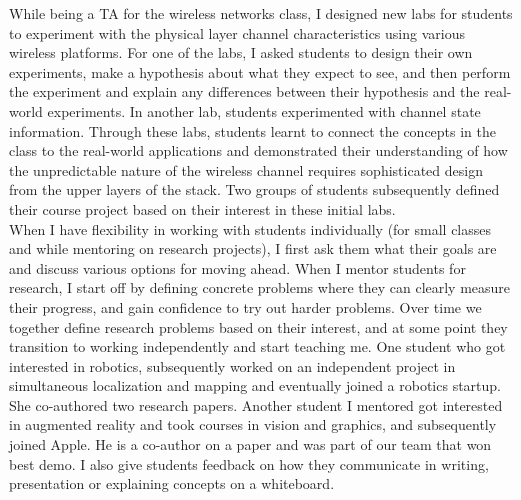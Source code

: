 \documentclass[10pt]{article}
\begin{document}
While being a TA for the wireless networks class, I designed new labs for students to experiment with the physical layer channel characteristics using various wireless platforms. 
For one of the labs, I asked students to design their own experiments, make a hypothesis about what they expect to see, and then perform the experiment and explain any differences between their hypothesis and the real-world experiments. In another lab, students experimented with channel state information. Through these labs, students learnt to connect the concepts in the class to the real-world applications and demonstrated their understanding of how the unpredictable nature of the wireless channel requires sophisticated design from the upper layers of the stack. Two groups of students subsequently defined their course project based on their interest in these initial labs. \\ 

When I have flexibility in working with students individually (for small classes and while mentoring on research projects), I first ask them what their goals are and discuss various options for moving ahead. 
When I mentor students for research, I start off by defining concrete problems where they can clearly measure their progress, and gain confidence to try out harder problems. Over time we together define research problems based on their interest, and at some point they transition to working independently and start teaching me. One student who got interested in robotics, subsequently worked on an independent project in simultaneous localization and mapping and eventually joined a robotics startup. She co-authored two research papers. Another student I mentored got interested in augmented reality and took courses in vision and graphics, and subsequently joined Apple. He is a co-author on a paper and was part of our team that won best demo. I also give students feedback on how they communicate in writing, presentation or explaining concepts on a whiteboard.
\end{document}
